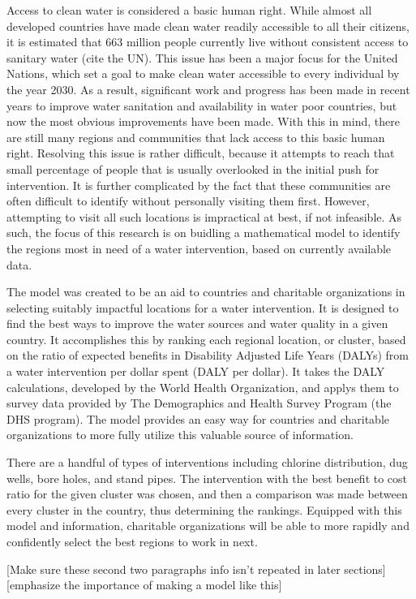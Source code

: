 Access to clean water is considered a basic human right.
While almost all developed countries have made clean water readily accessible to all their citizens, it is estimated that 663 million people currently live without consistent access to sanitary water (cite the UN).
This issue has been a major focus for the United Nations, which set a goal to  make clean water accessible to every individual by the year 2030.
As a result, significant work and progress has been made in recent years to improve water sanitation and availability in water poor countries, but now the most obvious improvements have been made.
With this in mind, there are still many regions and communities that lack access to this basic human right.
Resolving this issue is rather difficult, because it attempts to reach that small percentage of people that is usually overlooked in the initial push for intervention.
It is further complicated by the fact that these communities are often difficult to identify without personally visiting them first.
However, attempting to visit all such locations is impractical at best, if not infeasible.
As such, the focus of this research is on buidling a mathematical model to identify the regions most in need of a water intervention, based on currently available data. 

The model was created to be an aid to countries and charitable organizations in selecting suitably impactful locations for a water intervention.
It is designed to find the best ways to improve the water sources and water quality in a given country.
It accomplishes this by ranking each regional location, or cluster, based on the ratio of expected benefits in Disability Adjusted Life Years (DALYs) from a water intervention per dollar spent (DALY per dollar).
It takes the DALY calculations, developed by the World Health Organization, and applys them to survey data provided by The Demographics and Health Survey Program (the DHS program).
The model provides an easy way for countries and charitable  organizations to more fully utilize this valuable source of information.

There are a handful of types of interventions including chlorine distribution, dug wells, bore holes, and stand pipes.
The intervention with the best benefit to cost ratio for the given cluster was chosen, and then a comparison was made between every cluster in the country, thus determining the rankings.
Equipped with this model and information, charitable organizations will be able to more rapidly and confidently select the best regions to work in next.

[Make sure these second two paragraphs info isn't repeated in later sections]
[emphasize the importance of making a model like this]

